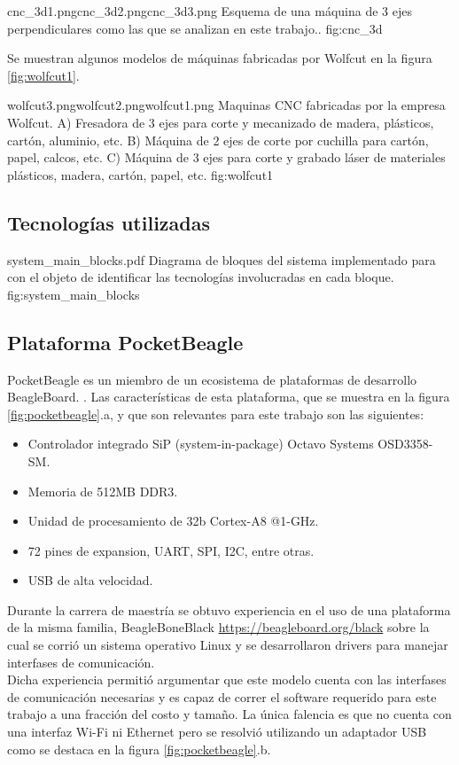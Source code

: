             {cnc_3d1.png}{cnc_3d2.png}{cnc_3d3.png}
            {Esquema de una máquina de 3 ejes perpendiculares como las que se analizan en este trabajo..}
            {fig:cnc_3d}

Se muestran algunos modelos de máquinas fabricadas por Wolfcut en la figura \ref{fig:wolfcut1}.

            {wolfcut3.png}{wolfcut2.png}{wolfcut1.png}
            {Maquinas CNC fabricadas por la empresa Wolfcut. A) Fresadora de 3 ejes para corte y mecanizado de madera, plásticos, cartón, aluminio, etc. B) Máquina de 2 ejes de corte por cuchilla para cartón, papel, calcos, etc. C) Máquina de 3 ejes para corte y grabado láser de materiales plásticos, madera, cartón, papel, etc.}
            {fig:wolfcut1}


\subsection{Tecnologías utilizadas}

         {system_main_blocks.pdf}
         {Diagrama de bloques del sistema implementado para con el objeto de identificar las tecnologías involucradas en cada bloque.}
         {fig:system_main_blocks}

\subsection{Plataforma PocketBeagle}
   PocketBeagle es un miembro de un ecosistema de plataformas de desarrollo BeagleBoard. \citep{WEBSITE:beagleboard}.
   Las características de esta plataforma, que se muestra en la figura \ref{fig:pocketbeagle}.a, y que son relevantes para este trabajo son las siguientes:
   \begin{itemize}
      \item{Controlador integrado SiP (system-in-package) Octavo Systems OSD3358-SM.}
      \item{Memoria de 512MB DDR3.}
      \item{Unidad de procesamiento de 32b Cortex-A8 @1-GHz.}
      \item{72 pines de expansion, UART, SPI, I2C, entre otras.}
      \item{USB de alta velocidad.}
   \end{itemize}
   Durante la carrera de maestría se obtuvo experiencia en el uso de una plataforma de la misma familia, BeagleBoneBlack \url{https://beagleboard.org/black} sobre la cual se corrió un sistema operativo Linux y se desarrollaron drivers para manejar interfases de comunicación. \\
   Dicha experiencia permitió argumentar que este modelo cuenta con las interfases de comunicación necesarias y es capaz de correr el software requerido para este trabajo a una fracción del costo y tamaño.
   La única falencia es que no cuenta con una interfaz Wi-Fi ni Ethernet pero se resolvió utilizando un adaptador USB como se destaca en la figura \ref{fig:pocketbeagle}.b.

